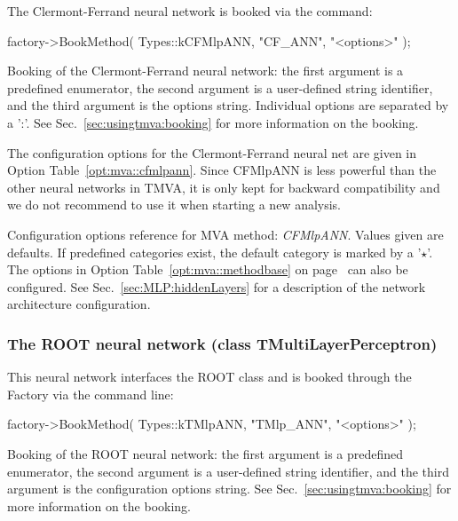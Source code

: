 The Clermont-Ferrand neural network is booked via the command:
\begin{codeexample}
\begin{tmvacode}
factory->BookMethod( Types::kCFMlpANN, "CF_ANN", "<options>" );
\end{tmvacode}
\caption[.]{\codeexampleCaptionSize Booking of the Clermont-Ferrand neural network: the first
            argument is a predefined enumerator, the second argument is a user-defined string
            identifier, and the third argument is the options string.
            Individual options are separated by a ':'.
            See Sec.~\ref{sec:usingtmva:booking} for more information on the booking.}
\end{codeexample}

The configuration options for the Clermont-Ferrand neural net are given
in Option Table~\ref{opt:mva::cfmlpann}. Since CFMlpANN is less powerful than the other neural networks in TMVA, it is only kept for backward compatibility and we do not recommend to use it when starting a new analysis.

\begin{option}[t]

\caption[.]{\optionCaptionSize
     Configuration options reference for MVA method: {\em CFMlpANN}.
     Values given are defaults. If predefined categories exist, the default category
     is marked by a '$\star$'. The options in Option Table~\ref{opt:mva::methodbase} on
     page~\pageref{opt:mva::methodbase} can also be configured.
     See Sec.~\ref{sec:MLP:hiddenLayers} for a description of the
     network architecture configuration.
}
\label{opt:mva::cfmlpann}
\end{option}

\subsubsection*{The ROOT neural network
                (class TMultiLayerPerceptron)}

This neural network interfaces the ROOT class  and is
booked through the Factory via the command line:
\begin{codeexample}
\begin{tmvacode}
factory->BookMethod( Types::kTMlpANN, "TMlp_ANN", "<options>" );
\end{tmvacode}
\caption[.]{\codeexampleCaptionSize Booking of the ROOT neural network: the
            first argument is a predefined enumerator, the second argument is a
            user-defined string identifier, and the third argument is the configuration
            options string. See Sec.~\ref{sec:usingtmva:booking} for more information on
            the booking.}
\end{codeexample}

